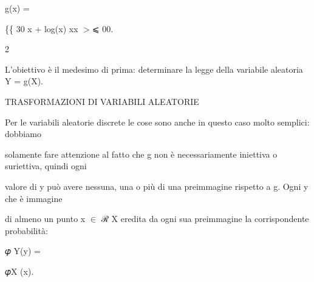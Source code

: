 \documentclass[a4paper,portrait,12pt]{article}
\begin{document}
\begin{flushleft}
g(x) =
\end{flushleft}





\begin{flushleft}
\{\{ 30 x + log(x) xx $>$⩽ 00.
\end{flushleft}


2





\begin{flushleft}
L'obiettivo \`{e} il medesimo di prima: determinare la legge della variabile aleatoria Y = g(X).
\end{flushleft}










\begin{flushleft}
TRASFORMAZIONI DI VARIABILI ALEATORIE
\end{flushleft}





\begin{flushleft}
Per le variabili aleatorie discrete le cose sono anche in questo caso molto semplici: dobbiamo
\end{flushleft}


\begin{flushleft}
solamente fare attenzione al fatto che g non \`{e} necessariamente iniettiva o suriettiva, quindi ogni
\end{flushleft}


\begin{flushleft}
valore di y pu\`{o} avere nessuna, una o più di una preimmagine rispetto a g. Ogni y che \`{e} immagine
\end{flushleft}


\begin{flushleft}
di almeno un punto x $\in$ ℛ X eredita da ogni sua preimmagine la corrispondente probabilit\`{a}:
\end{flushleft}


\begin{flushleft}
𝜑 Y(y) =
\end{flushleft}





\begin{flushleft}
𝜑X (x).
\end{flushleft}
\end{document}
